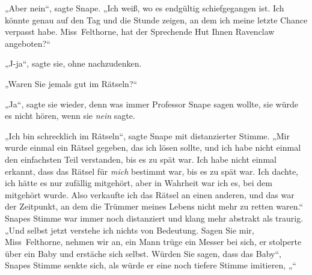 „Aber nein“, sagte Snape. „Ich weiß, wo es endgültig schiefgegangen ist. Ich könnte genau auf den Tag und die Stunde zeigen, an dem ich meine letzte Chance verpasst habe. Miss~Felthorne, hat der Sprechende Hut Ihnen Ravenclaw angeboten?“

„J-ja“, sagte sie, ohne nachzudenken.

„Waren Sie jemals gut im Rätseln?“

„Ja“, sagte sie wieder, denn was immer Professor Snape sagen wollte, sie würde es nicht hören, wenn sie \emph{nein} sagte.

„Ich bin schrecklich im Rätseln“, sagte Snape mit distanzierter Stimme. „Mir wurde einmal ein Rätsel gegeben, das ich lösen sollte, und ich habe nicht einmal den einfachsten Teil verstanden, bis es zu spät war. Ich habe nicht einmal erkannt, dass das Rätsel für \emph{mich} bestimmt war, bis es zu spät war. Ich dachte, ich hätte es nur zufällig mitgehört, aber in Wahrheit war ich es, bei dem mitgehört wurde. Also verkaufte ich das Rätsel an einen anderen, und das war der Zeitpunkt, an dem die Trümmer meines Lebens nicht mehr zu retten waren.“ Snapes Stimme war immer noch distanziert und klang mehr abstrakt als traurig. „Und selbst jetzt verstehe ich nichts von Bedeutung. Sagen Sie mir, Miss~Felthorne, nehmen wir an, ein Mann trüge ein Messer bei sich, er stolperte über ein Baby und erstäche sich selbst. Würden Sie sagen, dass das Baby“, Snapes Stimme senkte sich, als würde er eine noch tiefere Stimme imitieren, „“

